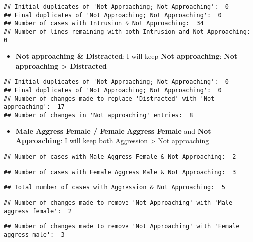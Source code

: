 \documentclass[
]{article}
\providecommand{\tightlist}{%
  \setlength{\itemsep}{0pt}\setlength{\parskip}{0pt}}
\begin{document}
\begin{verbatim}
## Initial duplicates of 'Not Approaching; Not Approaching':  0 
## Final duplicates of 'Not Approaching; Not Approaching':  0 
## Number of cases with Intrusion & Not Approaching:  34 
## Number of lines remaining with both Intrusion and Not Approaching:  0
\end{verbatim}

\begin{itemize}
\tightlist
\item
  \textbf{Not approaching \& Distracted}: I will keep \textbf{Not
  approaching}: \textbf{Not approaching \textgreater{} Distracted}
\end{itemize}

\begin{verbatim}
## Initial duplicates of 'Not Approaching; Not Approaching':  0 
## Final duplicates of 'Not Approaching; Not Approaching':  0 
## Number of changes made to replace 'Distracted' with 'Not approaching':  17 
## Number of changes in 'Not approaching' entries:  8
\end{verbatim}

\begin{itemize}
\tightlist
\item
  \textbf{Male Aggress Female / Female Aggress Female} and \textbf{Not
  Approaching}: I will keep both Aggression \textgreater{} Not
  approaching
\end{itemize}

\begin{verbatim}
## Number of cases with Male Aggress Female & Not Approaching:  2
\end{verbatim}

\begin{verbatim}
## Number of cases with Female Aggress Male & Not Approaching:  3
\end{verbatim}

\begin{verbatim}
## Total number of cases with Aggression & Not Approaching:  5
\end{verbatim}

\begin{verbatim}
## Number of changes made to remove 'Not Approaching' with 'Male aggress female':  2
\end{verbatim}

\begin{verbatim}
## Number of changes made to remove 'Not Approaching' with 'Female aggress male':  3
\end{verbatim}
\end{document}

